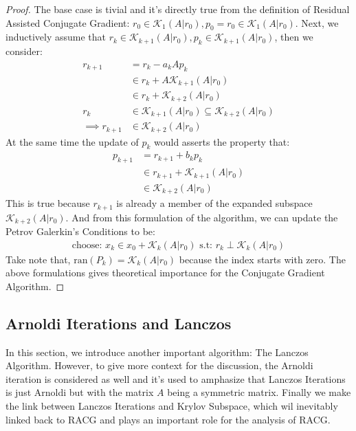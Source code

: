 \documentclass[]{article}
\theoremstyle{definition}
\begin{document}
            \begin{proof}
                The base case is tivial and it's directly true from the definition of Residual Assisted Conjugate Gradient: $r_0 \in \mathcal K_1(A|r_0), p_0 = r_0 \in \mathcal K_1(A|r_0)$. Next, we inductively assume that $r_k \in \mathcal K_{k + 1}(A|r_0), p_k \in \mathcal K_{k + 1}(A|r_0)$, then we consider: 
                \begin{align}
                    r_{k + 1} &= r_k - a_kAp_k
                    \\
                    &\in r_k + A\mathcal K_{k + 1}(A|r_0)
                    \\
                    &\in r_k + \mathcal K_{k + 2}(A|r_0)
                    \\
                    r_k 
                    &\in 
                    \mathcal K_{k + 1}(A|r_0) \subseteq \mathcal K_{k + 2}(A|r_0)
                    \\
                    \implies r_{k + 1}
                    &\in 
                    \mathcal K_{k + 2}(A|r_0)
                \end{align}
                At the same time the update of $p_k$ would asserts the property that: 
                \begin{align}
                    p_{k + 1} &= r_{k + 1} + b_kp_k
                    \\
                    &\in 
                    r_{k + 1} + \mathcal K_{k + 1}(A|r_0)
                    \\
                    &\in \mathcal K_{k + 2}(A|r_0)
                \end{align}
                This is true because $r_{k + 1}$ is already a member of the expanded subspace $\mathcal K_{k + 2}(A|r_0)$. And from this formulation of the algorithm, we can update the Petrov Galerkin's Conditions to be: 
                \begin{align}
                    \text{choose: } x_k\in x_0 + \mathcal K_{k}(A|r_0) \text{ s.t: } r_k \perp \mathcal K_{k}(A|r_0)
                \end{align}
                Take note that, $\text{ran}(P_k) = \mathcal K_k(A|r_0)$ because the index starts with zero. The above formulations gives theoretical importance for the Conjugate Gradient Algorithm. 
            \end{proof}
    \subsection{Arnoldi Iterations and Lanczos}
        In this section, we introduce another important algorithm: The Lanczos Algorithm. However, to give more context for the discussion, the Arnoldi iteration is considered as well and it's used to amphasize that Lanczos Iterations is just Arnoldi but with the matrix $A$ being a symmetric matrix. Finally we make the link between Lanczos Iterations and Krylov Subspace, which wil inevitably linked back to RACG and plays an important role for the analysis of RACG. 
\end{document}
